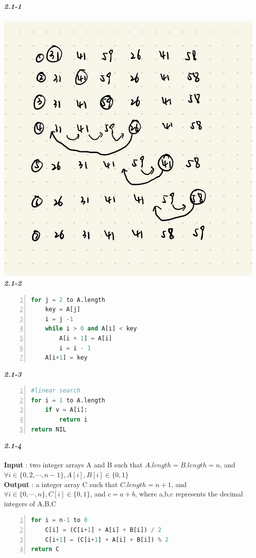 
\textbf{\textit{\Large{2.1-1}}}\\
\\
\includegraphics[scale=0.2]{sections/2/exercise2-1-1.jpeg}\\


\textbf{\textit{\Large{2.1-2}}}
\begin{lstlisting}[language=Python,numbers=left,numberstyle=\normalsize]
for j = 2 to A.length
    key = A[j]
    i = j -1 
    while i > 0 and A[i] < key
        A[i + 1] = A[i]
        i = i - 1
    A[i+1] = key
\end{lstlisting}


\textbf{\textit{\Large{2.1-3}}}
\begin{lstlisting}[language=Python,numbers=left,numberstyle=\normalsize]
#linear search
for i = 1 to A.length
    if v = A[i]:
        return i
return NIL
\end{lstlisting}


\textbf{\textit{\Large{2.1-4}}}\\
\\
\textbf{Input} : two integer arrays A and B such that $A.length=B.length=n$, and
$ \forall i \in \{0,2,\cdots,n-1\}, A[i],B[i] \in \{0,1\} $\\
\textbf{Output} : a integer array C such that $C.length=n+1$, and
$ \forall i \in \{0,\cdots,n\}, C[i]\in \{0,1\} $, and $c=a+b$, where a,b,c represents the decimal integers of A,B,C
\begin{lstlisting}[language=Python,numbers=left,numberstyle=\normalsize]
for i = n-1 to 0
    C[i] = (C[i+1] + A[i] + B[i]) / 2
    C[i+1] = (C[i+1] + A[i] + B[i]) % 2
return C
\end{lstlisting}